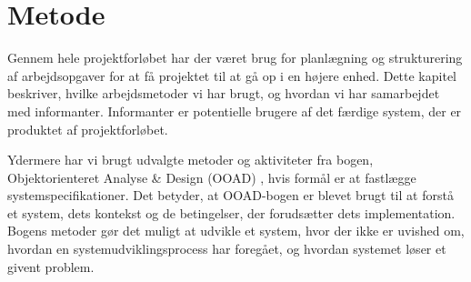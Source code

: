\chapter{Metode}
\label{chap:metode}

Gennem hele projektforløbet har der været brug for planlægning og strukturering af arbejdsopgaver for at få projektet til at gå op i en højere enhed. Dette kapitel beskriver, hvilke arbejdsmetoder vi har brugt, og hvordan vi har samarbejdet med informanter. Informanter er potentielle brugere af det færdige system, der er produktet af projektforløbet.

Ydermere har vi brugt udvalgte metoder og aktiviteter fra bogen, Objektorienteret Analyse \& Design (OOAD) \cite{ooad}, hvis formål er at fastlægge systemspecifikationer. Det betyder, at OOAD-bogen er blevet brugt til at forstå et system, dets kontekst og de betingelser, der forudsætter dets implementation. Bogens metoder gør det muligt at udvikle et system, hvor der ikke er uvished om, hvordan en systemudviklingsprocess har foregået, og hvordan systemet løser et givent problem.






